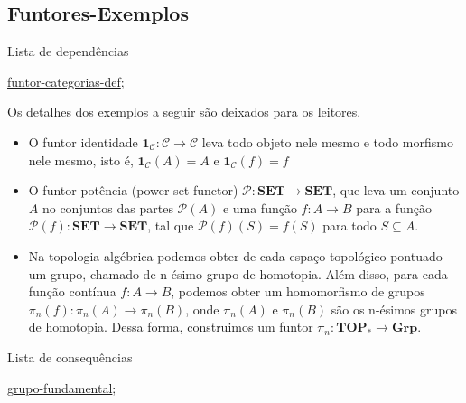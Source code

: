 \subsection{Funtores-Exemplos}
\label{funtor-categorias-ex}
\begin{titlemize}{Lista de dependências}
	\item \hyperref[funtor-categorias-def]{funtor-categorias-def};\\ %
\end{titlemize}

\begin{ex}
	Os detalhes dos exemplos a seguir são deixados para os leitores.
\begin{itemize}

    \item O funtor identidade $\mathbf{1}_{\mathcal{C}}: \mathcal{C} \longrightarrow \mathcal{C}$ leva todo objeto nele mesmo e todo morfismo nele mesmo, isto é, $\mathbf{1}_{\mathcal{C}}(A) = A$ e $\mathbf{1}_{\mathcal{C}}(f) = f$
    
    \item O funtor potência (power-set functor) $\mathcal{P}:\mathbf{SET} \longrightarrow \mathbf{SET}$, que leva um conjunto $A$ no conjuntos das partes $\mathcal{P}(A)$ e uma função $f:A \longrightarrow B$ para a função $\mathcal{P}(f): \mathbf{SET} \longrightarrow \mathbf{SET}$, tal que $\mathcal{P}(f)(S) = f(S)$ para todo $S \subseteq A$.

    \item Na topologia algébrica podemos obter de cada espaço topológico pontuado um grupo, chamado de n-ésimo grupo de homotopia. Além disso, para cada função contínua $f: A \longrightarrow B$, podemos obter um homomorfismo de grupos $\pi_n(f):\pi_n(A) \longrightarrow \pi_n(B)$, onde $\pi_n(A)$ e $\pi_n(B)$ são os n-ésimos grupos de homotopia. Dessa forma, construimos um funtor $\pi_n: \mathbf{TOP}_* \longrightarrow \mathbf{Grp}$. 

\end{itemize}
\end{ex}

 

\begin{titlemize}{Lista de consequências}
	\item \hyperref[grupo-fundamental]{grupo-fundamental};\\ %
\end{titlemize}
